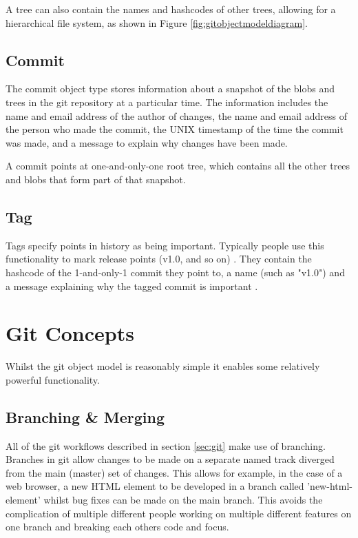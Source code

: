 \documentclass[11pt]{book}
\begin{document}
A tree can also contain the names and hashcodes of other trees, allowing for a hierarchical file system, as shown in Figure \ref{fig:gitobjectmodeldiagram}. 

\subsection{Commit}
The commit object type stores information about a snapshot of the blobs and trees in the git repository at a particular time. The information includes the name and email address of the author of changes, the name and email address of the person who made the commit, the UNIX timestamp of the time the commit was made, and a message to explain why changes have been made.

A commit points at one-and-only-one root tree, which contains all the other trees and blobs that form part of that snapshot.

\subsection{Tag}
Tags specify points in history as being important. Typically people use this functionality to mark release points (v1.0, and so on) \cite{gitdocstags}. They contain the hashcode of the 1-and-only-1 commit they point to, a name (such as "v1.0") and a message explaining why the tagged commit is important \cite{gitforcomputerscientists}.

\section{Git Concepts}
Whilst the git object model is reasonably simple it enables some relatively powerful functionality.

\subsection{Branching \& Merging}
All of the git workflows described in section \ref{sec:git} make use of branching. Branches in git allow changes to be made on a separate named track diverged from the main (master) set of changes. This allows for example, in the case of a web browser, a new HTML element to be developed in a branch called 'new-html-element' whilst bug fixes can be made on the main branch. This avoids the complication of multiple different people working on multiple different features on one branch and breaking each others code and focus.
\end{document}
